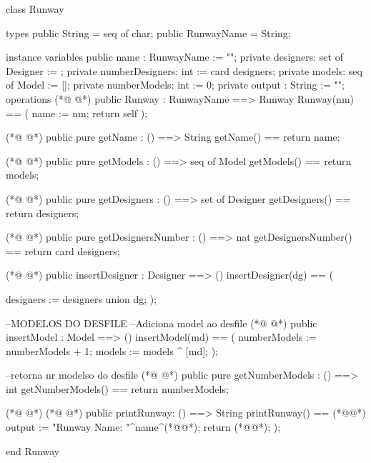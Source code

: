 \begin{vdmpp}[breaklines=true]
class Runway

types
 public String = seq of char;
 public RunwayName = String;
 
instance variables
 public  name : RunwayName := "";
 private designers: set of Designer := {};
 private numberDesigners: int := card designers;
 private models: seq of Model := [];
 private numberModels: int := 0;
 private output : String := "";
 operations
(*@
\label{Runway:15}
@*)
 public Runway : 
         RunwayName 
          ==> Runway
  Runway(nm) == (
  name := nm;
  return self
 );
 
(*@
\label{getName:23}
@*)
 public pure getName : () ==> String
    getName() == return name;
  
(*@
\label{getModels:26}
@*)
 public pure getModels : () ==> seq of Model
     getModels() == return models;
     
(*@
\label{getDesigners:29}
@*)
 public pure getDesigners : () ==> set of Designer
     getDesigners() == return designers;  
 
(*@
\label{getDesignersNumber:32}
@*)
 public pure getDesignersNumber : () ==> nat
     getDesignersNumber() == return card designers;  
         
(*@
\label{insertDesigner:35}
@*)
 public insertDesigner : Designer ==> ()
  insertDesigner(dg) ==
  (
   
    designers := designers union  {dg};
  );
  
  --MODELOS DO DESFILE
  --Adiciona model ao desfile
(*@
\label{insertModel:44}
@*)
 public insertModel : Model ==> ()
  insertModel(md) ==
  (
    numberModels := numberModels + 1;
    models := models ^  [md];
  );
  
  --retorna nr modelso do desfile
(*@
\label{getNumberModels:52}
@*)
  public pure getNumberModels : () ==> int
  getNumberModels() == return numberModels;
  
(*@
\label{printRunway:55}
@*)
(*@
\label{printModel:55}
@*)
  public printRunway: () ==> String
  printRunway() == (*@\vdmnotcovered{(}@*)
  output := "Runway Name: "^name^(*@@*);
  return (*@@*);
  );
  
    
end Runway
\end{vdmpp}
\bigskip

